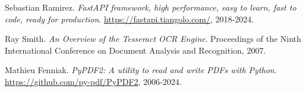 \documentclass[12pt,a4paper]{article}
\begin{document}

\begin{thebibliography}{9}

Sebastian Ramirez.
\textit{FastAPI framework, high performance, easy to learn, fast to code, ready for production}.
\url{https://fastapi.tiangolo.com/}, 2018-2024.

Ray Smith.
\textit{An Overview of the Tesseract OCR Engine}.
Proceedings of the Ninth International Conference on Document Analysis and Recognition, 2007.

Mathieu Fenniak.
\textit{PyPDF2: A utility to read and write PDFs with Python}.
\url{https://github.com/py-pdf/PyPDF2}, 2006-2024.

\end{thebibliography}
\end{document}
